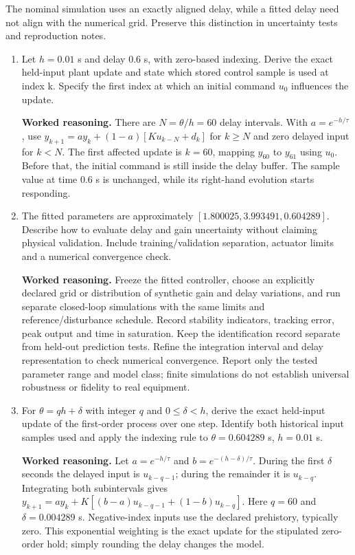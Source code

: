 \documentclass[10pt,a4paper]{article}
\newcommand{\task}[2]{\par\medskip{\color{ink}\Large\bfseries #1. #2}\par\smallskip}
\newcommand{\answer}{\par\smallskip\textbf{Worked reasoning.} }
\begin{document}
\newpage
\task{5}{Implementing a noninteger transport delay}
The nominal simulation uses an exactly aligned delay, while a fitted delay need not align with the numerical grid. Preserve this distinction in uncertainty tests and reproduction notes.
\begin{enumerate}
\item Let $h=0.01$ s and delay 0.6 s, with zero-based indexing. Derive the exact held-input plant update and state which stored control sample is used at index k. Specify the first index at which an initial command $u_0$ influences the update.
\answer There are $N=\theta/h=60$ delay intervals. With $a=e^{-h/\tau}$, use $y_{k+1}=ay_k+(1-a)[K u_{k-N}+d_k]$ for $k\ge N$ and zero delayed input for $k<N$. The first affected update is $k=60$, mapping $y_{60}$ to $y_{61}$ using $u_0$. Before that, the initial command is still inside the delay buffer. The sample value at time 0.6 s is unchanged, while its right-hand evolution starts responding.
\item The fitted parameters are approximately $[1.800025,3.993491,0.604289]$. Describe how to evaluate delay and gain uncertainty without claiming physical validation. Include training/validation separation, actuator limits and a numerical convergence check.
\answer Freeze the fitted controller, choose an explicitly declared grid or distribution of synthetic gain and delay variations, and run separate closed-loop simulations with the same limits and reference/disturbance schedule. Record stability indicators, tracking error, peak output and time in saturation. Keep the identification record separate from held-out prediction tests. Refine the integration interval and delay representation to check numerical convergence. Report only the tested parameter range and model class; finite simulations do not establish universal robustness or fidelity to real equipment.
\item For $\theta=qh+\delta$ with integer $q$ and $0\le\delta<h$, derive the exact held-input update of the first-order process over one step. Identify both historical input samples used and apply the indexing rule to $\theta=0.604289$ s, $h=0.01$ s.
\answer Let $a=e^{-h/\tau}$ and $b=e^{-(h-\delta)/\tau}$. During the first $\delta$ seconds the delayed input is $u_{k-q-1}$; during the remainder it is $u_{k-q}$. Integrating both subintervals gives $y_{k+1}=ay_k+K[(b-a)u_{k-q-1}+(1-b)u_{k-q}]$. Here $q=60$ and $\delta=0.004289$ s. Negative-index inputs use the declared prehistory, typically zero. This exponential weighting is the exact update for the stipulated zero-order hold; simply rounding the delay changes the model.
\end{enumerate}
\end{document}
